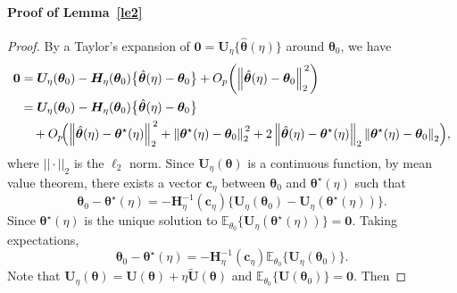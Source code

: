 \documentclass{article}
\theoremstyle{plain}
\theoremstyle{definition}
\theoremstyle{remark}
\begin{document}
\paragraph{Proof of Lemma~\ref{le2}}
\begin{proof}
By a Taylor's expansion of $\boldsymbol{0}=\boldsymbol{U}_{\eta}\{\hat{\boldsymbol{\theta}}(\eta)\}$ around $\boldsymbol{\theta}_0$, we have
\begin{align*}
\boldsymbol{0}
&= \boldsymbol{U}_{\eta}(\boldsymbol{\theta}_0)
   - \boldsymbol{H}_{\eta}(\boldsymbol{\theta}_0)\bigl\{\hat{\boldsymbol{\theta}}(\eta)-\boldsymbol{\theta}_0\bigr\}
   + O_p\!\left(\left\Vert\hat{\boldsymbol{\theta}}(\eta)-\boldsymbol{\theta}_0\right\Vert_2^{\,2}\right) \\
&= \boldsymbol{U}_{\eta}(\boldsymbol{\theta}_0)
   - \boldsymbol{H}_{\eta}(\boldsymbol{\theta}_0)\bigl\{\hat{\boldsymbol{\theta}}(\eta)-\boldsymbol{\theta}_0\bigr\} \\
&\quad + O_p\!\Bigl(
      \left\Vert\hat{\boldsymbol{\theta}}(\eta)-\boldsymbol{\theta}^{\star}(\eta)\right\Vert_2^{\,2}
    + \left\Vert\boldsymbol{\theta}^{\star}(\eta)-\boldsymbol{\theta}_0\right\Vert_2^{\,2}
    + 2\left\Vert\hat{\boldsymbol{\theta}}(\eta)-\boldsymbol{\theta}^{\star}(\eta)\right\Vert_2
      \left\Vert\boldsymbol{\theta}^{\star}(\eta)-\boldsymbol{\theta}_0\right\Vert_2
   \Bigr),
\end{align*}
where $||\cdot||_2$ is the $\ell_2$ norm. Since $\boldsymbol{U}_{\eta}(\boldsymbol{\theta})$ is a continuous function, by mean value theorem, there exists a vector $\boldsymbol{c}_\eta$ between $\boldsymbol{\theta}_0$ and $\boldsymbol{\theta}^\star(\eta)$ such that
\begin{equation*}
    \boldsymbol{\theta}_0-\boldsymbol{\theta}^\star(\eta)=-\boldsymbol{H}_{\eta}^{-1}(\boldsymbol{c}_\eta)\{\boldsymbol{U}_{\eta}(\boldsymbol{\theta}_0)-\boldsymbol{U}_{\eta}(\boldsymbol{\theta}^\star(\eta))\}.
\end{equation*}
Since $\boldsymbol{\theta}^\star(\eta)$ is the unique solution to $\mathbb{E}_{\theta_0}\{\boldsymbol{U}_{\eta}(\boldsymbol{\theta}^\star(\eta))\}=\boldsymbol{0}$. Taking expectations, 
\begin{equation*}
    \boldsymbol{\theta}_0-\boldsymbol{\theta}^\star(\eta)=-\boldsymbol{H}_{\eta}^{-1}(\boldsymbol{c}_\eta)\mathbb{E}_{\theta_0}\{\boldsymbol{U}_{\eta}(\boldsymbol{\theta}_0)\}.
\end{equation*}
Note that $\boldsymbol{U}_\eta(\boldsymbol{\theta})=\boldsymbol{U}(\boldsymbol{\theta})+\eta \widetilde{\boldsymbol{U}}(\boldsymbol{\theta})$ and $\mathbb{E}_{\theta_0}\{\boldsymbol{U}(\boldsymbol{\theta}_0)\}=\boldsymbol{0}$. Then

\end{proof}
\end{document}
